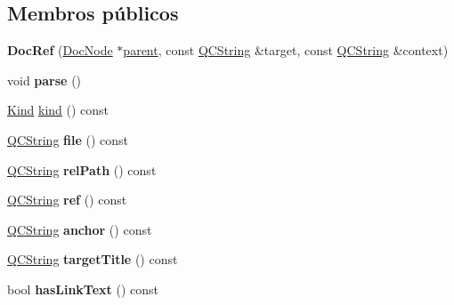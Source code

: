 \subsection*{Membros públicos}
\begin{DoxyCompactItemize}
\item 
\hypertarget{class_doc_ref_a13d1126d1bd5838a3f318d36736ec1c4}{{\bfseries Doc\-Ref} (\hyperlink{class_doc_node}{Doc\-Node} $\ast$\hyperlink{class_doc_node_abd7f070d6b0a38b4da71c2806578d19d}{parent}, const \hyperlink{class_q_c_string}{Q\-C\-String} \&target, const \hyperlink{class_q_c_string}{Q\-C\-String} \&context)}\label{class_doc_ref_a13d1126d1bd5838a3f318d36736ec1c4}

\item 
\hypertarget{class_doc_ref_ad7c704b34912678d95c13243cacf9d7f}{void {\bfseries parse} ()}\label{class_doc_ref_ad7c704b34912678d95c13243cacf9d7f}

\item 
\hyperlink{class_doc_node_aa10c9e8951b8ccf714a59ec321bdac5b}{Kind} \hyperlink{class_doc_ref_aa9d037bed9f9a083d0cd01485637d843}{kind} () const 
\item 
\hypertarget{class_doc_ref_aeaa8cdb0fbabc1058b7d3813f2fd223b}{\hyperlink{class_q_c_string}{Q\-C\-String} {\bfseries file} () const }\label{class_doc_ref_aeaa8cdb0fbabc1058b7d3813f2fd223b}

\item 
\hypertarget{class_doc_ref_a3aa6799d4713d51d9cc4862af165671c}{\hyperlink{class_q_c_string}{Q\-C\-String} {\bfseries rel\-Path} () const }\label{class_doc_ref_a3aa6799d4713d51d9cc4862af165671c}

\item 
\hypertarget{class_doc_ref_aba9c65e4f9c616d6552a1b5d5e9519a6}{\hyperlink{class_q_c_string}{Q\-C\-String} {\bfseries ref} () const }\label{class_doc_ref_aba9c65e4f9c616d6552a1b5d5e9519a6}

\item 
\hypertarget{class_doc_ref_acd17ae1d9600f864b1beb85dfb99a4f4}{\hyperlink{class_q_c_string}{Q\-C\-String} {\bfseries anchor} () const }\label{class_doc_ref_acd17ae1d9600f864b1beb85dfb99a4f4}

\item 
\hypertarget{class_doc_ref_afd4ac3ebbdc43f879f54b4658997d72a}{\hyperlink{class_q_c_string}{Q\-C\-String} {\bfseries target\-Title} () const }\label{class_doc_ref_afd4ac3ebbdc43f879f54b4658997d72a}

\item 
\hypertarget{class_doc_ref_a4f5b9d0d50cfb5fd8520a00eb09e9e7e}{bool {\bfseries has\-Link\-Text} () const }\label{class_doc_ref_a4f5b9d0d50cfb5fd8520a00eb09e9e7e}


\end{DoxyCompactItemize}
